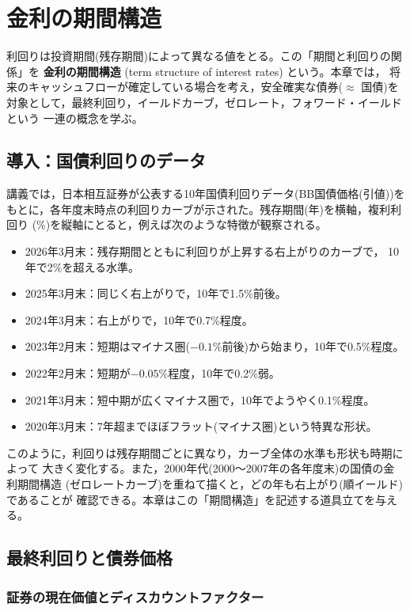 \chapter{金利の期間構造}

利回りは投資期間(残存期間)によって異なる値をとる。この「期間と利回りの関係」を
\textbf{金利の期間構造} (term structure of interest rates) という。本章では，
将来のキャッシュフローが確定している場合を考え，安全確実な債券($\approx$ 国債)を
対象として，最終利回り，イールドカーブ，ゼロレート，フォワード・イールドという
一連の概念を学ぶ。

\section*{導入：国債利回りのデータ}

講義では，日本相互証券が公表する10年国債利回りデータ(BB国債価格(引値))を
もとに，各年度末時点の利回りカーブが示された。残存期間(年)を横軸，複利利回り
(\%)を縦軸にとると，例えば次のような特徴が観察される。

\begin{itemize}
\item 2026年3月末：残存期間とともに利回りが上昇する右上がりのカーブで，
10年で2\%を超える水準。
\item 2025年3月末：同じく右上がりで，10年で1.5\%前後。
\item 2024年3月末：右上がりで，10年で0.7\%程度。
\item 2023年2月末：短期はマイナス圏($-0.1\%$前後)から始まり，10年で0.5\%程度。
\item 2022年2月末：短期が$-0.05\%$程度，10年で0.2\%弱。
\item 2021年3月末：短中期が広くマイナス圏で，10年でようやく0.1\%程度。
\item 2020年3月末：7年超までほぼフラット(マイナス圏)という特異な形状。
\end{itemize}

このように，利回りは残存期間ごとに異なり，カーブ全体の水準も形状も時期によって
大きく変化する。また，2000年代(2000〜2007年の各年度末)の国債の金利期間構造
(ゼロレートカーブ)を重ねて描くと，どの年も右上がり(順イールド)であることが
確認できる。本章はこの「期間構造」を記述する道具立てを与える。

\section{最終利回りと債券価格}

\subsection{証券の現在価値とディスカウントファクター}

